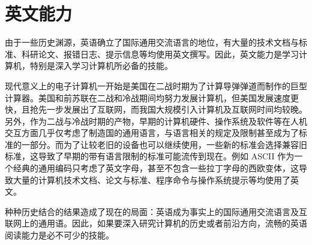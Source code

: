 \section{英文能力}\label{sec:Preclass/english}
    由于一些历史渊源，英语确立了国际通用交流语言的地位，有大量的技术文档与标准、科研论文、报错日志、提示信息等均使用英文撰写。因此，英文能力是学习计算机，特别是深入学习计算机所必备的技能。

    现代意义上的电子计算机一开始是美国在二战时期为了计算导弹弹道而制作的巨型计算器。美国和前苏联在二战和冷战期间均努力发展计算机，但美国发展速度更快，且抢先一步发展出了互联网，而我国大规模引入计算机及互联网时间均较晚。另外，作为二战与冷战时期的产物，早期的计算机硬件、操作系统及软件等在人机交互方面几乎仅考虑了制造国的通用语言，与语言相关的规定及限制甚至成为了标准的一部分。而为了让较老旧的设备也可以继续使用，一些新的标准会选择兼容旧标准，这导致了早期的带有语言限制的标准可能流传到现在。例如 ASCII 作为一个经典的通用编码只考虑了英文字母，甚至不包含一些拉丁字母的西欧变体，这导致大量的计算机技术文档、论文与标准、程序命令与操作系统提示等均使用了英文。

    种种历史结合的结果造成了现在的局面：英语成为事实上的国际通用交流语言及互联网上的通用语。因此，如果要深入研究计算机的历史或者前沿方向，流畅的英语阅读能力是必不可少的技能。
